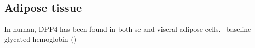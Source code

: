 \subsection{Adipose tissue}
In human, DPP4 has been found in both sc and viseral adipose cells.~\cite{Lamers2011} baseline glycated hemoglobin () 